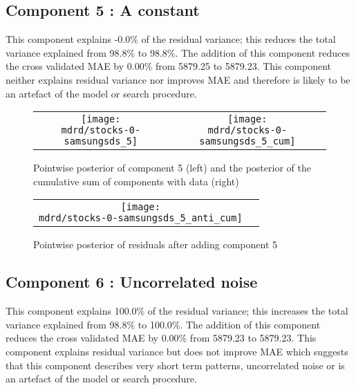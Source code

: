\documentclass{article} %
\begin{document}
\subsection{Component 5 : A constant}



This component explains -0.0\% of the residual variance; this reduces the total variance explained from 98.8\% to 98.8\%.
The addition of this component reduces the cross validated MAE by 0.00\% from 5879.25 to 5879.23.
This component neither explains residual variance nor improves MAE and therefore is likely to be an artefact of the model or search procedure.

\begin{figure}[H]
\newcommand{\wmgd}{0.5\columnwidth}
\newcommand{\hmgd}{3.0cm}
\newcommand{\mdrd}{stocks-0-samsungsds}
\newcommand{\mbm}{\hspace{-0.3cm}}
\begin{tabular}{cc}
\mbm \texttt{[image: \\mdrd/stocks-0-samsungsds\_5]} & \texttt{[image: \\mdrd/stocks-0-samsungsds\_5\_cum]}
\end{tabular}
\caption{Pointwise posterior of component 5 (left) and the posterior of the cumulative sum of components with data (right)}
\label{fig:comp5}
\end{figure}

\begin{figure}[H]
\newcommand{\wmgd}{0.5\columnwidth}
\newcommand{\hmgd}{3.0cm}
\newcommand{\mdrd}{stocks-0-samsungsds}
\newcommand{\mbm}{\hspace{-0.3cm}}
\begin{tabular}{cc}
\mbm \texttt{[image: \\mdrd/stocks-0-samsungsds\_5\_anti\_cum]}
\end{tabular}
\caption{Pointwise posterior of residuals after adding component 5}
\label{fig:comp5}
\end{figure}

\subsection{Component 6 : Uncorrelated noise}



This component explains 100.0\% of the residual variance; this increases the total variance explained from 98.8\% to 100.0\%.
The addition of this component reduces the cross validated MAE by 0.00\% from 5879.23 to 5879.23.
This component explains residual variance but does not improve MAE which suggests that this component describes very short term patterns, uncorrelated noise or is an artefact of the model or search procedure.
\end{document}
